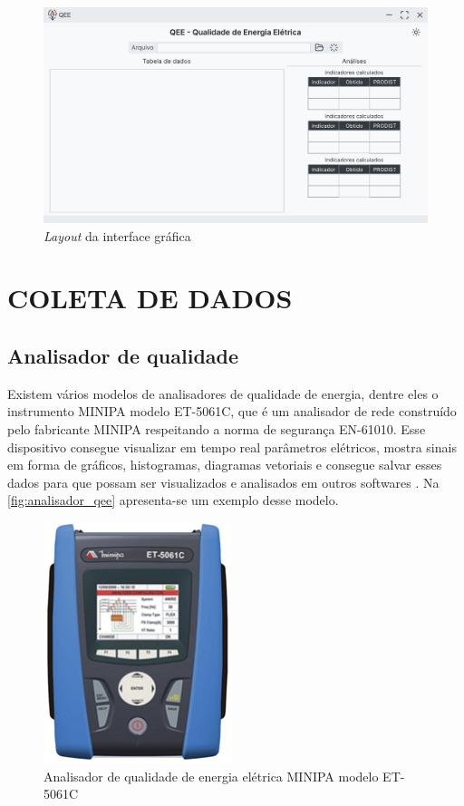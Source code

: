 \begin{figure}[H]
	\centering
	\caption{\textit{Layout} da interface gráfica}
	\label{fig:main_windown}
	\includegraphics[width=16cm]{illustrations/figures/main_windown.pdf}
\end{figure}

\section{COLETA DE DADOS}

\subsection{Analisador de qualidade}

Existem vários modelos de analisadores de qualidade de energia, dentre eles o instrumento MINIPA modelo ET-5061C, que é um analisador de rede construído pelo fabricante MINIPA respeitando a norma de segurança EN-61010. Esse dispositivo consegue visualizar em tempo real parâmetros elétricos, mostra sinais em forma de gráficos, histogramas, diagramas vetoriais e consegue salvar esses dados para que possam ser visualizados e analisados em outros softwares \cite{ref:minipa_2019}. Na \autoref{fig:analisador_qee} apresenta-se um exemplo desse modelo.

\begin{figure}[H]
	\centering
	\caption{Analisador de qualidade de energia elétrica MINIPA modelo ET-5061C}
	\label{fig:analisador_qee}
	\includegraphics[width=5.5cm]{illustrations/figures/analisador_qee.png}
\end{figure}

